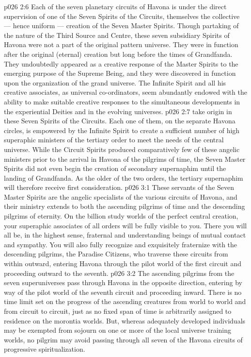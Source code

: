 \vs p026 2:6 \pc Each of the seven planetary circuits of Havona is under the direct supervision of one of the Seven Spirits of the Circuits, themselves the collective --- hence uniform --- creation of the Seven Master Spirits. Though partaking of the nature of the Third Source and Centre, these seven subsidiary Spirits of Havona were not a part of the original pattern universe. They were in function after the original (eternal) creation but long before the times of Grandfanda. They undoubtedly appeared as a creative response of the Master Spirits to the emerging purpose of the Supreme Being, and they were discovered in function upon the organization of the grand universe. The Infinite Spirit and all his creative associates, as universal co\hyp{}ordinators, seem abundantly endowed with the ability to make suitable creative responses to the simultaneous developments in the experiential Deities and in the evolving universes.
\vs p026 2:7 \pc {} take origin in these Seven Spirits of the Circuits. Each one of them, on the separate Havona circles, is empowered by the Infinite Spirit to create a sufficient number of high superaphic ministers of the tertiary order to meet the needs of the central universe. While the Circuit Spirits produced comparatively few of these angelic ministers prior to the arrival in Havona of the pilgrims of time, the Seven Master Spirits did not even begin the creation of secondary supernaphim until the landing of Grandfanda. As the older of the two orders, the tertiary supernaphim will therefore receive first consideration.
\vs p026 3:1 These servants of the Seven Master Spirits are the angelic specialists of the various circuits of Havona, and their ministry extends to both the ascending pilgrims of time and the descending pilgrims of eternity. On the billion study worlds of the perfect central creation, your superaphic associates of all orders will be fully visible to you. There you will all be, in the highest sense, fraternal and understanding beings of mutual contact and sympathy. You will also fully recognize and exquisitely fraternize with the descending pilgrims, the Paradise Citizens, who traverse these circuits from within outward, entering Havona through the pilot world of the first circuit and proceeding outward to the seventh.
\vs p026 3:2 The ascending pilgrims from the seven superuniverses pass through Havona in the opposite direction, entering by way of the pilot world of the seventh circuit and proceeding inward. There is no time limit set on the progress of the ascending creatures from world to world and from circuit to circuit, just as no fixed span of time is arbitrarily assigned to residence on the morontia worlds. But, whereas adequately developed individuals may be exempted from sojourn on one or more of the local universe training worlds, no pilgrim may avoid passing through all seven of the Havona circuits of progressive spiritualization.
